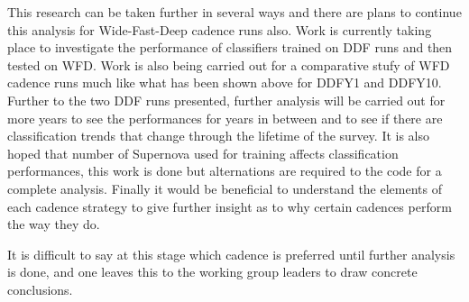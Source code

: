 This research can be taken further in several ways and there are plans to
continue this analysis for Wide-Fast-Deep cadence runs also. Work is currently
taking place to investigate the performance of classifiers trained on DDF runs
and then tested on WFD. Work is also being carried out for a comparative stufy
of WFD cadence runs much like what has been shown above for DDFY1 and DDFY10.
Further to the two DDF runs presented, further analysis will be carried out for
more years to see the performances for years in between and to see if there
are classification trends that change through the lifetime of the survey. It is
also hoped that number of Supernova used for training affects classification
performances, this work is done but alternations are required to the code for a complete
analysis. Finally it would be beneficial to understand the elements of each cadence
strategy to give further insight as to why certain cadences perform the way they do.

It is difficult to say at this stage which cadence is preferred until further
analysis is done, and one leaves this to the working group leaders to draw
concrete conclusions.

